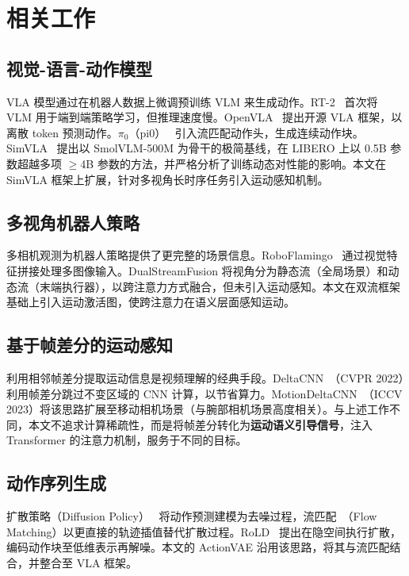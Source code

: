\documentclass[10pt,twocolumn]{article}
\begin{document}
\section{相关工作}
\label{sec:related}

\subsection{视觉-语言-动作模型}

VLA 模型通过在机器人数据上微调预训练 VLM 来生成动作。RT-2~\cite{rt2} 首次将 VLM 用于端到端策略学习，但推理速度慢。OpenVLA~\cite{openvla} 提出开源 VLA 框架，以离散 token 预测动作。$\pi_0$（pi0）~\cite{pi0} 引入流匹配动作头，生成连续动作块。SimVLA~\cite{simvla2026} 提出以 SmolVLM-500M 为骨干的极简基线，在 LIBERO 上以 0.5B 参数超越多项 $\geq$4B 参数的方法，并严格分析了训练动态对性能的影响。本文在 SimVLA 框架上扩展，针对多视角长时序任务引入运动感知机制。

\subsection{多视角机器人策略}

多相机观测为机器人策略提供了更完整的场景信息。RoboFlamingo~\cite{roboflamingo} 通过视觉特征拼接处理多图像输入。DualStreamFusion 将视角分为静态流（全局场景）和动态流（末端执行器），以跨注意力方式融合，但未引入运动感知。本文在双流框架基础上引入运动激活图，使跨注意力在语义层面感知运动。

\subsection{基于帧差分的运动感知}

利用相邻帧差分提取运动信息是视频理解的经典手段。DeltaCNN~\cite{deltacnn2022}（CVPR 2022）利用帧差分跳过不变区域的 CNN 计算，以节省算力。MotionDeltaCNN~\cite{motiondeltacnn2023}（ICCV 2023）将该思路扩展至移动相机场景（与腕部相机场景高度相关）。与上述工作不同，本文不追求计算稀疏性，而是将帧差分转化为\textbf{运动语义引导信号}，注入 Transformer 的注意力机制，服务于不同的目标。

\subsection{动作序列生成}

扩散策略（Diffusion Policy）~\cite{diffpolicy} 将动作预测建模为去噪过程，流匹配~\cite{flowmatching}（Flow Matching）以更直接的轨迹插值替代扩散过程。RoLD~\cite{rold} 提出在隐空间执行扩散，编码动作块至低维表示再解噪。本文的 ActionVAE 沿用该思路，将其与流匹配结合，并整合至 VLA 框架。
\end{document}
